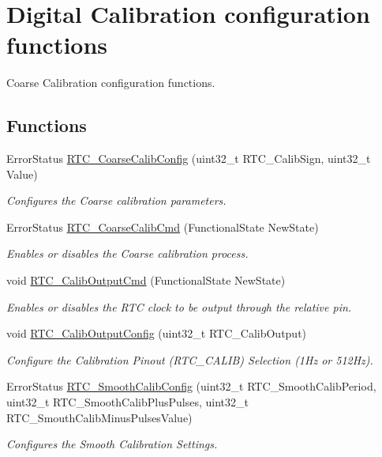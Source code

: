 \hypertarget{group___r_t_c___group7}{}\section{Digital Calibration configuration functions}
\label{group___r_t_c___group7}


Coarse Calibration configuration functions.  


\subsection*{Functions}
\begin{DoxyCompactItemize}
\item 
Error\+Status \hyperlink{group___r_t_c___group7_gaa3bb10170a2c70ac9ce3e41c611bdd43}{R\+T\+C\+\_\+\+Coarse\+Calib\+Config} (uint32\+\_\+t R\+T\+C\+\_\+\+Calib\+Sign, uint32\+\_\+t Value)
\begin{DoxyCompactList}\small\item\em Configures the Coarse calibration parameters. \end{DoxyCompactList}\item 
Error\+Status \hyperlink{group___r_t_c___group7_ga008ae7173b2befe876f5e76686bc9089}{R\+T\+C\+\_\+\+Coarse\+Calib\+Cmd} (Functional\+State New\+State)
\begin{DoxyCompactList}\small\item\em Enables or disables the Coarse calibration process. \end{DoxyCompactList}\item 
void \hyperlink{group___r_t_c___group7_ga25eaa2de5ee858a4572d5fb1eb146ff8}{R\+T\+C\+\_\+\+Calib\+Output\+Cmd} (Functional\+State New\+State)
\begin{DoxyCompactList}\small\item\em Enables or disables the R\+T\+C clock to be output through the relative pin. \end{DoxyCompactList}\item 
void \hyperlink{group___r_t_c___group7_ga2139adc802bdb6882904c0b855d50b29}{R\+T\+C\+\_\+\+Calib\+Output\+Config} (uint32\+\_\+t R\+T\+C\+\_\+\+Calib\+Output)
\begin{DoxyCompactList}\small\item\em Configure the Calibration Pinout (R\+T\+C\+\_\+\+C\+A\+L\+I\+B) Selection (1\+Hz or 512\+Hz). \end{DoxyCompactList}\item 
Error\+Status \hyperlink{group___r_t_c___group7_ga91a28dcc7d45340a469dd8b8c029f841}{R\+T\+C\+\_\+\+Smooth\+Calib\+Config} (uint32\+\_\+t R\+T\+C\+\_\+\+Smooth\+Calib\+Period, uint32\+\_\+t R\+T\+C\+\_\+\+Smooth\+Calib\+Plus\+Pulses, uint32\+\_\+t R\+T\+C\+\_\+\+Smouth\+Calib\+Minus\+Pulses\+Value)
\begin{DoxyCompactList}\small\item\em Configures the Smooth Calibration Settings. \end{DoxyCompactList}\end{DoxyCompactItemize}


